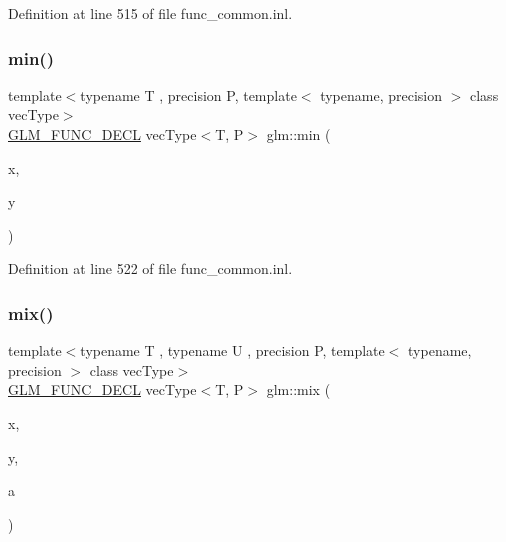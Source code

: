Definition at line 515 of file func\+\_\+common.\+inl.

\mbox{\label{group__core__func__common_ga502b20a691e374cf42dea6e3d126d476}} 
\subsubsection{\texorpdfstring{min()}{min()}\hspace{0.1cm}{\footnotesize\ttfamily [3/3]}}
{\footnotesize\ttfamily template$<$typename T , precision P, template$<$ typename, precision $>$ class vec\+Type$>$ \\
\mbox{\hyperlink{setup_8hpp_ab2d052de21a70539923e9bcbf6e83a51}{G\+L\+M\+\_\+\+F\+U\+N\+C\+\_\+\+D\+E\+CL}} vec\+Type$<$T, P$>$ glm\+::min (\begin{DoxyParamCaption}\item[{vec\+Type$<$ T, P $>$ const \&}]{x,  }\item[{vec\+Type$<$ T, P $>$ const \&}]{y }\end{DoxyParamCaption})}



Definition at line 522 of file func\+\_\+common.\+inl.

\mbox{\label{group__core__func__common_gadccbaffe46f369cf1a96b2aef92cbfdd}} 
\subsubsection{\texorpdfstring{mix()}{mix()}\hspace{0.1cm}{\footnotesize\ttfamily [1/3]}}
{\footnotesize\ttfamily template$<$typename T , typename U , precision P, template$<$ typename, precision $>$ class vec\+Type$>$ \\
\mbox{\hyperlink{setup_8hpp_ab2d052de21a70539923e9bcbf6e83a51}{G\+L\+M\+\_\+\+F\+U\+N\+C\+\_\+\+D\+E\+CL}} vec\+Type$<$T, P$>$ glm\+::mix (\begin{DoxyParamCaption}\item[{vec\+Type$<$ T, P $>$ const \&}]{x,  }\item[{vec\+Type$<$ T, P $>$ const \&}]{y,  }\item[{vec\+Type$<$ U, P $>$ const \&}]{a }\end{DoxyParamCaption})}

